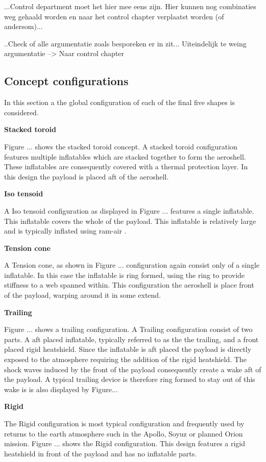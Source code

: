...Control department moet het hier mee eens zijn. Hier kunnen nog combinaties weg gehaald worden en naar het control chapter verplaatst worden (of andersom)... 

..Check of alle argumentatie zoals besporeken er in zit... Uiteindelijk te weing argumentatie --> Naar control chapter

\subsection{Concept configurations} \label{sec:conf}

In this section a the global configuration of each of the final five shapes is considered.

\textbf{Stacked toroid}

Figure ... shows the stacked toroid concept. A stacked toroid configuration features multiple inflatables which are stacked together to form the aeroshell. These inflatables are consequently covered with a thermal protection layer. In this design the payload is placed aft of the aeroshell.\

\textbf{Iso tensoid}

A Iso tensoid configuration as displayed in Figure ... features a single inflatable. This inflatable covers the whole of the payload. This inflatable is relatively large and is typically inflated using ram-air \cite{Smith2011}. 

\textbf{Tension cone}

A Tension cone, as shown in Figure ... configuration again consist only of a single inflatable. In this case the inflatable is ring formed, using the ring to provide stiffness to a web spanned within. This configuration the aeroshell is place front of the payload, warping around it in some extend.

\textbf{Trailing}

Figure ... shows a trailing configuration. A Trailing configuration consist of two parts. A aft placed inflatable, typically referred to as the the trailing, and a front placed rigid heatshield. Since the inflatable is aft placed the payload is directly exposed to the atmosphere requiring the addition of the rigid heatshield. The shock waves induced by the front of the payload consequently create a wake aft of the payload. A typical trailing device is therefore ring formed to stay out of this wake is is also displayed by Figure...

\textbf{Rigid}

The Rigid configuration is most typical configuration and frequently used by returns to the earth atmosphere such in the Apollo, Soyuz or planned Orion mission. Figure ... shows the Rigid configuration. This design features a rigid heatshield in front of the payload and has no inflatable parts.



